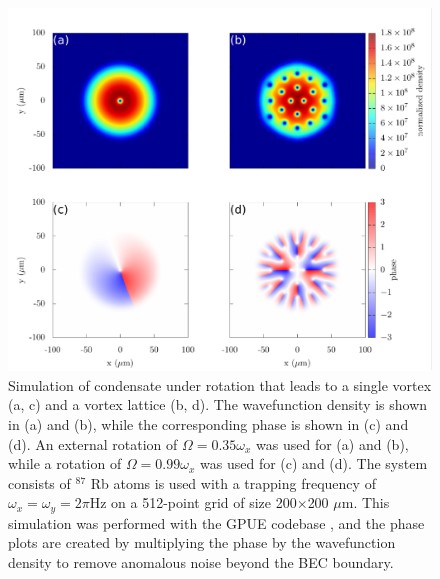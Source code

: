 \begin{figure}

\includegraphics[width=\textwidth]{data/splitop/rot/WIP.pdf}

\caption{
Simulation of condensate under rotation that leads to a single vortex (a, c) and a vortex lattice (b, d).
The wavefunction density is shown in (a) and (b), while the corresponding phase is shown in (c) and (d).
An external rotation of $\Omega = 0.35\omega_x$ was used for (a) and (b), while a rotation of $\Omega = 0.99\omega_x$ was used for (c) and (d).
The system consists of $^87$ Rb atoms is used with a trapping frequency of $\omega_x = \omega_y = 2\pi$Hz on a 512-point grid of size 200$\times$200 $\mu$m.
This simulation was performed with the GPUE codebase \cite{schloss2018}, and the phase plots are created by multiplying the phase by the wavefunction density to remove anomalous noise beyond the BEC boundary.}
\label{fig:rot}
\end{figure}

